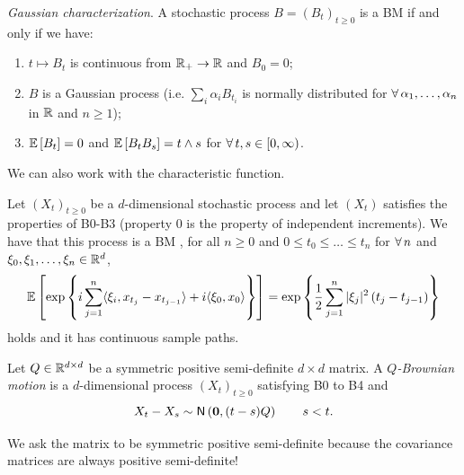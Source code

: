 \documentclass[12pt]{report}
\begin{document}
\begin{proposition}
	\emph{Gaussian characterization}. A stochastic process $B={(B_{t})}_{t\geq0}$ is a BM if and only if we have:
	\begin{enumerate}
		\item $t\mapsto B_{t}$ is continuous from $\mathbb{R}_{+}\to\mathbb{R}$ and $B_{0}=0$;
		\item $B$ is a Gaussian process (i.e. $\sum_{i}\alpha_{i}B_{t_{i}}$ is normally distributed for $\forall\,\alpha_{1},\ldots,\alpha_{n}$ in $\mathbb{R}$ and $n\geq 1$);
		\item $\mathbb{E}\left[B_{t}\right]=0$ and $\mathbb{E}\left[B_{t}B_{s}\right]=t\wedge s$ for $\forall\, t,s\in[0,\infty)$.
	\end{enumerate}
\end{proposition}
We can also work with the characteristic function.
\begin{lemma}
	Let ${(X_{t})}_{t\geq0}$ be a $d$-dimensional stochastic process and let $(X_{t})$ satisfies the properties of \bwm{} B0-B3 (property 0 is the property of independent increments). We have that this process is a BM \ifonly{}, for all $n\geq0$ and $0\leq t_{0}\leq\ldots\leq t_{n}$ for $\forall\, n$ and $\xi_{0},\xi_{1},\ldots,\xi_{n}\in\mathbb{R}^{d}$, 
	\begin{equation*}
		\mathbb{E}\left[\exp\left\{i\sum^{n}_{j=1}\langle\xi_{i},x_{t_{j}}-x_{t_{j-1}}\rangle+i\langle\xi_{0},x_{0}\rangle\right\}\right]=\exp\left\{\frac{1}{2}\sum_{j=1}^{n}|\xi_{j}|^{2}\left(t_{j}-t_{j-1}\right)\right\}
	\end{equation*}
	holds and it has continuous sample paths.
\end{lemma}
\begin{definition}
	Let $Q\in\mathbb{R}^{d\times d}$ be a symmetric positive semi-definite $d\times d$ matrix. A \emph{$Q$-Brownian motion} is a $d$-dimensional process ${(X_{t})}_{t\geq 0}$ satisfying B0 to B4 and
	\begin{equation*}
		X_{t}-X_{s}\sim\mathsf{N}\left(\mathbf{0},(t-s)Q\right)\qquad s<t.
	\end{equation*}
\end{definition}
We ask the matrix to be symmetric positive semi-definite because the covariance matrices are always positive semi-definite!
\end{document}
